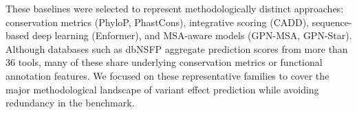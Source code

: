 \documentclass[unnumsec,webpdf,contemporary,large]{oup-authoring-template}%
\newcommand{\rev}[1]{{\color{red}#1}}
\theoremstyle{thmstyleone}%
\theoremstyle{thmstyletwo}%
\theoremstyle{thmstylethree}%
\begin{document}
\rev{These baselines were selected to represent methodologically distinct approaches: conservation metrics (PhyloP, PhastCons), integrative scoring (CADD), sequence-based deep learning (Enformer), and MSA-aware models (GPN-MSA, GPN-Star). Although databases such as dbNSFP aggregate prediction scores from more than 36 tools, many of these share underlying conservation metrics or functional annotation features. We focused on these representative families to cover the major methodological landscape of variant effect prediction while avoiding redundancy in the benchmark.}


\end{document}

